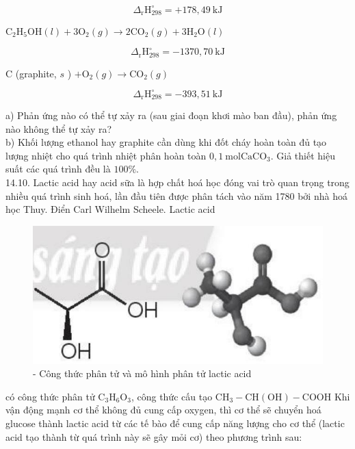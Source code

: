 \documentclass[10pt]{article}
\begin{document}
$$
\Delta_{\mathrm{r}} \mathrm{H}_{298}^{\circ}=+178,49 \mathrm{~kJ}
$$

$\mathrm{C}_{2} \mathrm{H}_{5} \mathrm{OH}(l)+3 \mathrm{O}_{2}(g) \rightarrow 2 \mathrm{CO}_{2}(g)+3 \mathrm{H}_{2} \mathrm{O}(l)$

$$
\Delta_{\mathrm{r}} \mathrm{H}_{298}^{\circ}=-1370,70 \mathrm{~kJ}
$$

C (graphite, $s$ ) $+\mathrm{O}_{2}(g) \rightarrow \mathrm{CO}_{2}(g)$

$$
\Delta_{\mathrm{r}} \mathrm{H}_{298}^{\circ}=-393,51 \mathrm{~kJ}
$$

a) Phản ứng nào có thể tự xảy ra (sau giai đoạn khơi mào ban đầu), phản ứng nào không thể tự xảy ra?\\
b) Khối lượng ethanol hay graphite cần dùng khi đốt cháy hoàn toàn đủ tạo lượng nhiệt cho quá trình nhiệt phân hoàn toàn $0,1 \mathrm{~mol} \mathrm{CaCO}_{3}$. Giả thiết hiệu suất các quá trình đều là $100 \%$.\\
14.10. Lactic acid hay acid sữa là hợp chất hoá học đóng vai trò quan trọng trong nhiều quá trình sinh hoá, lần đầu tiên được phân tách vào năm 1780 bởi nhà hoá học Thuy. Điển Carl Wilhelm Scheele. Lactic acid

\begin{figure}[h]
\begin{center}
  \includegraphics[width=\textwidth]{2025_10_23_883c4b146e2332109fcdg-53}
\captionsetup{labelformat=empty}
\caption{- Công thức phân tử và mô hình phân tử lactic acid}
\end{center}
\end{figure}

có công thức phân tử $\mathrm{C}_{3} \mathrm{H}_{6} \mathrm{O}_{3}$, công thức cấu tạo $\mathrm{CH}_{3}-\mathrm{CH}(\mathrm{OH})-\mathrm{COOH}$ Khi vận động mạnh cơ thể không đủ cung cấp oxygen, thì cơ thể sẽ chuyển hoá glucose thành lactic acid từ các tế bào để cung cấp năng lượng cho cơ thể (lactic acid tạo thành từ quá trình này sẽ gây mỏi cơ) theo phương trình sau:
\end{document}
